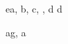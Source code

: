 \begin{eqcode}{e}{a, b, c}{, , }{}
  d \in {} \lend
  d \gets {} \lend %

\end{eqcode}

\begin{eqcode}{a}{g, a }{}{}   
\end{eqcode}
